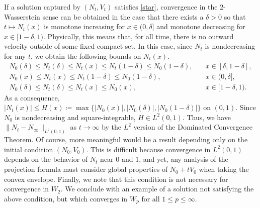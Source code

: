 \documentclass[11pt]{article}
\numberwithin{equation}{section}
\begin{document}
    If a solution captured by $(N_t,V_t)$ satisfies \eqref{star}, convergence in the $2$-Wasserstein sense can be obtained in the case that there exists a $\delta>0$ so that $t\mapsto N_t(x)$ is monotone increasing for $x\in(0,\delta]$ and monotone decreasing for $x\in[1-\delta,1)$. Physically, this means that, for all time, there is no outward velocity outside of some fixed compact set. In this case, since $N_t$ is nondecreasing for any $t$, we obtain the following bounds on $N_t(x)$. 
    \begin{align*}
        N_0(\delta)\leq N_t(\delta)\leq N_t(x)\leq N_t(1-\delta)\leq N_0(1-\delta), \quad &x\in[\delta,1-\delta],
        \\
        N_0(x)\leq N_t(x)\leq N_t(1-\delta)\leq N_0(1-\delta), \quad &x\in(0,\delta],
        \\
        N_0(\delta)\leq N_t(\delta)\leq N_t(x)\leq N_0(x), \quad &x\in[1-\delta,1).
    \end{align*}
    As a consequence, $|N_t(x)|\leq H(x)\coloneq\max\{|N_0(x)|,|N_0(\delta)|,|N_0(1-\delta)|\}$ on $(0,1)$. Since $N_0$ is nondecreasing and square-integrable, $H\in L^2(0,1)$. Thus, we have $\|N_t-N_\infty\|_{L^2(0,1)}$ as $t\to\infty$ by the $L^2$ version of the Dominated Convergence Theorem. Of course, more meaningful would be a result depending only on the initial condition $(N_0,V_0)$. This is difficult because convergence in $L^2(0,1)$ depends on the behavior of $N_t$ near $0$ and $1$, and yet, any analysis of the projection formula must consider global properties of $N_0+tV_0$ when taking the convex envelope. Finally, we note that this condition is not necessary for convergence in $W_2$. We conclude with an example of a solution not satisfying the above condition, but which converges in $W_p$ for all $1\leq p\leq\infty$. 
\end{document}
